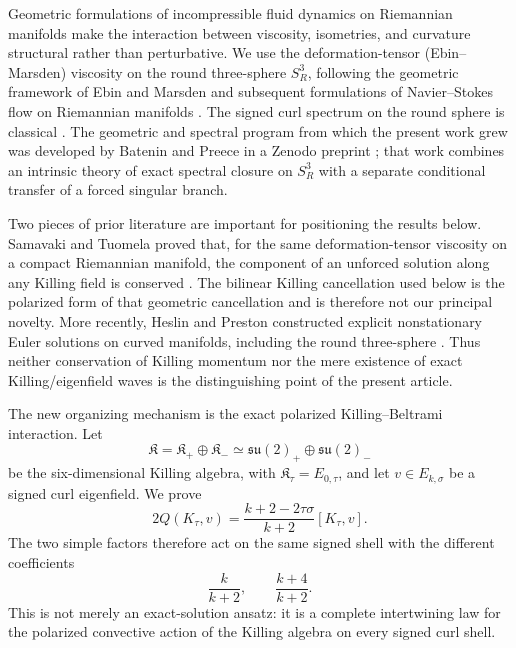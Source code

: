 \documentclass[
 aps,
 prd,
 reprint,
 amsmath,
 amssymb,
 nofootinbib,
 superscriptaddress
]{revtex4-2}
\theoremstyle{definition}
\theoremstyle{remark}
\begin{document}
Geometric formulations of incompressible fluid dynamics on Riemannian
manifolds make the interaction between viscosity, isometries, and curvature
structural rather than perturbative. We use the deformation-tensor
(Ebin--Marsden) viscosity on the round three-sphere $S^3_R$, following the
geometric framework of Ebin and Marsden and subsequent formulations of
Navier--Stokes flow on Riemannian manifolds
\cite{EbinMarsden1970,ChanCzubakDisconzi2017,SamavakiTuomela2020}.
The signed curl spectrum on the round sphere is classical
\cite{IkedaTaniguchi1978}. The geometric and spectral program from which the
present work grew was developed by Batenin and Preece in a Zenodo preprint
\cite{PreeceBatenin2026}; that work combines an intrinsic theory of exact
spectral closure on $S^3_R$ with a separate conditional transfer of a forced
singular branch.

Two pieces of prior literature are important for positioning the results
below. Samavaki and Tuomela proved that, for the same deformation-tensor
viscosity on a compact Riemannian manifold, the component of an unforced
solution along any Killing field is conserved
\cite{SamavakiTuomela2020}. The bilinear Killing cancellation used below is
the polarized form of that geometric cancellation and is therefore not our
principal novelty. More recently, Heslin and Preston constructed explicit
nonstationary Euler solutions on curved manifolds, including the round
three-sphere \cite{HeslinPreston2026}. Thus neither conservation of Killing
momentum nor the mere existence of exact Killing/eigenfield waves is the
distinguishing point of the present article.

The new organizing mechanism is the exact polarized Killing--Beltrami
interaction. Let
\[
 \mathfrak K=\mathfrak K_+\oplus\mathfrak K_-
 \simeq\mathfrak{su}(2)_+\oplus\mathfrak{su}(2)_-
\]
be the six-dimensional Killing algebra, with
$\mathfrak K_\tau=E_{0,\tau}$, and let
$v\in E_{k,\sigma}$ be a signed curl eigenfield. We prove
\begin{equation}
 \boxed{
 2Q(K_\tau,v)
 =
 \frac{k+2-2\tau\sigma}{k+2}[K_\tau,v].
 }
 \label{eq:intro-intertwining}
\end{equation}
The two simple factors therefore act on the same signed shell with the
different coefficients
\begin{equation}
 \frac{k}{k+2},
 \qquad
 \frac{k+4}{k+2}.
 \label{eq:intro-chiral-coeffs}
\end{equation}
This is not merely an exact-solution ansatz: it is a complete intertwining law
for the polarized convective action of the Killing algebra on every signed
curl shell.
\end{document}
